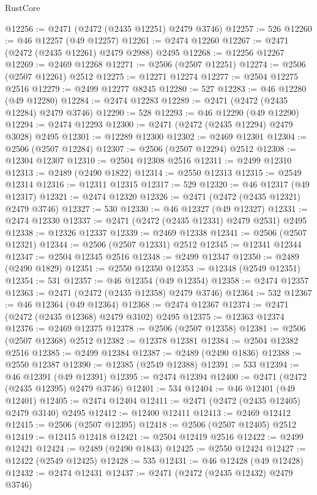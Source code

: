 \begin{lexlean}{RustCore}
\begin{coremodule}
@12256 := @2471 (@2472 (@2435 @12251) @2479 @3746)
@12257 := 526
@12260 := @46 @12257 (@49 @12257)
@12261 := @2474 @12260
@12267 := @2471 (@2472 (@2435 @12261) @2479 @2988) @2495
@12268 := @12256 @12267
@12269 := @2469 @12268
@12271 := @2506 (@2507 @12251)
@12274 := @2506 (@2507 @12261) @2512
@12275 := @12271 @12274
@12277 := @2504 @12275 @2516
@12279 := @2499 @12277 @8245
@12280 := 527
@12283 := @46 @12280 (@49 @12280)
@12284 := @2474 @12283
@12289 := @2471 (@2472 (@2435 @12284) @2479 @3746)
@12290 := 528
@12293 := @46 @12290 (@49 @12290)
@12294 := @2474 @12293
@12300 := @2471 (@2472 (@2435 @12294) @2479 @3028) @2495
@12301 := @12289 @12300
@12302 := @2469 @12301
@12304 := @2506 (@2507 @12284)
@12307 := @2506 (@2507 @12294) @2512
@12308 := @12304 @12307
@12310 := @2504 @12308 @2516
@12311 := @2499 @12310
@12313 := @2489 (@2490 @1822)
@12314 := @2550 @12313
@12315 := @2549 @12314
@12316 := @12311 @12315
@12317 := 529
@12320 := @46 @12317 (@49 @12317)
@12321 := @2474 @12320
@12326 := @2471 (@2472 (@2435 @12321) @2479 @3746)
@12327 := 530
@12330 := @46 @12327 (@49 @12327)
@12331 := @2474 @12330
@12337 := @2471 (@2472 (@2435 @12331) @2479 @2531) @2495
@12338 := @12326 @12337
@12339 := @2469 @12338
@12341 := @2506 (@2507 @12321)
@12344 := @2506 (@2507 @12331) @2512
@12345 := @12341 @12344
@12347 := @2504 @12345 @2516
@12348 := @2499 @12347
@12350 := @2489 (@2490 @1829)
@12351 := @2550 @12350
@12353 := @12348 (@2549 @12351)
@12354 := 531
@12357 := @46 @12354 (@49 @12354)
@12358 := @2474 @12357
@12363 := @2471 (@2472 (@2435 @12358) @2479 @3746)
@12364 := 532
@12367 := @46 @12364 (@49 @12364)
@12368 := @2474 @12367
@12374 := @2471 (@2472 (@2435 @12368) @2479 @3102) @2495
@12375 := @12363 @12374
@12376 := @2469 @12375
@12378 := @2506 (@2507 @12358)
@12381 := @2506 (@2507 @12368) @2512
@12382 := @12378 @12381
@12384 := @2504 @12382 @2516
@12385 := @2499 @12384
@12387 := @2489 (@2490 @1836)
@12388 := @2550 @12387
@12390 := @12385 (@2549 @12388)
@12391 := 533
@12394 := @46 @12391 (@49 @12391)
@12395 := @2474 @12394
@12400 := @2471 (@2472 (@2435 @12395) @2479 @3746)
@12401 := 534
@12404 := @46 @12401 (@49 @12401)
@12405 := @2474 @12404
@12411 := @2471 (@2472 (@2435 @12405) @2479 @3140) @2495
@12412 := @12400 @12411
@12413 := @2469 @12412
@12415 := @2506 (@2507 @12395)
@12418 := @2506 (@2507 @12405) @2512
@12419 := @12415 @12418
@12421 := @2504 @12419 @2516
@12422 := @2499 @12421
@12424 := @2489 (@2490 @1843)
@12425 := @2550 @12424
@12427 := @12422 (@2549 @12425)
@12428 := 535
@12431 := @46 @12428 (@49 @12428)
@12432 := @2474 @12431
@12437 := @2471 (@2472 (@2435 @12432) @2479 @3746)

\end{coremodule}
\end{lexlean}
